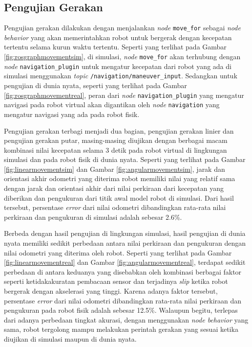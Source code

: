 \subsection{Pengujian Gerakan}
\label{subsec:movementtesting}




Pengujian gerakan dilakukan dengan menjalankan \emph{node} \lstinline{move_for} sebagai \emph{node behavior} yang akan memerintahkan robot untuk bergerak dengan kecepatan tertentu selama kurun waktu tertentu.
Seperti yang terlihat pada Gambar \ref{fig:rosgraphmovementsim},
  di simulasi,
  \emph{node} \lstinline{move_for} akan terhubung dengan \emph{node} \lstinline{navigation_plugin} untuk mengatur kecepatan dari robot yang ada di simulasi menggunakan \emph{topic} \lstinline{/navigation/maneuver_input}.
Sedangkan untuk pengujian di dunia nyata, seperti yang terlihat pada Gambar \ref{fig:rosgraphmovementreal},
  peran dari \emph{node} \lstinline{navigation_plugin} yang mengatur navigasi pada robot virtual akan digantikan oleh \emph{node} \lstinline{navigation} yang mengatur navigasi yang ada pada robot fisik.




Pengujian gerakan terbagi menjadi dua bagian,
  pengujian gerakan linier dan pengujian gerakan putar,
  masing-masing diujikan dengan berbagai macam kombinasi nilai kecepatan selama 3 detik pada robot virtual di lingkungan simulasi dan pada robot fisik di dunia nyata.
Seperti yang terlihat pada Gambar \ref{fig:linearmovementsim} dan Gambar \ref{fig:angularmovementsim},
  jarak dan orientasi akhir odometri yang diterima robot memiliki nilai yang relatif sama dengan jarak dan orientasi akhir dari nilai perkiraan dari kecepatan yang diberikan dan pengukuran dari titik awal model robot di simulasi.
Dari hasil tersebut, persentase \emph{error} dari nilai odometri dibandingkan rata-rata nilai perkiraan dan pengukuran di simulasi adalah sebesar 2.6\%.




Berbeda dengan hasil pengujian di lingkungan simulasi,
  hasil pengujian di dunia nyata memiliki sedikit perbedaan antara nilai perkiraan dan pengukuran dengan nilai odometri yang diterima oleh robot.
Seperti yang terlihat pada Gambar \ref{fig:linearmovementreal} dan Gambar \ref{fig:angularmovementreal},
  terdapat sedikit perbedaan di antara keduanya yang disebabkan oleh kombinasi berbagai faktor seperti ketidakakuratan pembacaan sensor dan terjadinya \emph{slip} ketika robot bergerak dengan akselerasi yang tinggi.
Karena adanya faktor tersebut,
  persentase \emph{error} dari nilai odometri dibandingkan rata-rata nilai perkiraan dan pengukuran pada robot fisik adalah sebesar 12.5\%.
Walaupun begitu,
  terlepas dari adanya perbedaan tingkat akurasi,
  dengan menggunakan \emph{node behavior} yang sama,
  robot tergolong mampu melakukan perintah gerakan yang sesuai ketika diujikan di simulasi maupun di dunia nyata.
